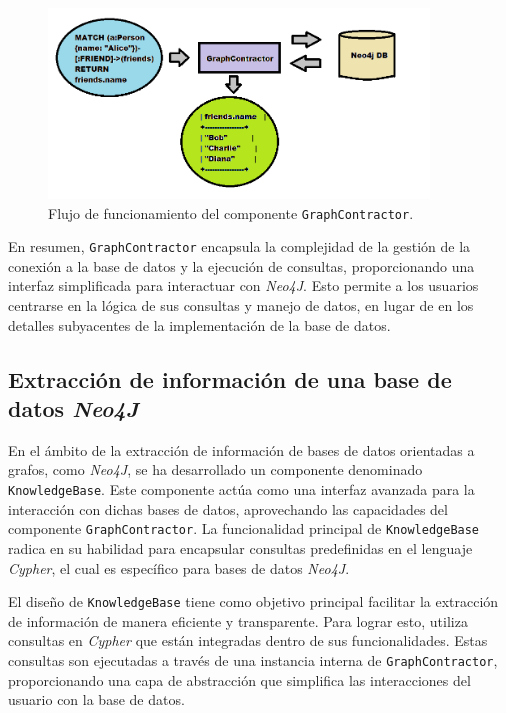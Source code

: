 \begin{figure}[H]\label{gcimage}
	\centering
	\includegraphics[width = 0.9\textwidth]{./Graphics/graph_contractor}
	\caption{Flujo de funcionamiento del componente \texttt{GraphContractor}.}
\end{figure}

En resumen, \texttt{GraphContractor} encapsula la complejidad de la gestión de la conexión a la base de datos y la ejecución de consultas, proporcionando una interfaz simplificada para interactuar con \textit{Neo4J}. Esto permite a los usuarios centrarse en la lógica de sus consultas y manejo de datos, en lugar de en los detalles subyacentes de la implementación de la base de datos.

\subsection{Extracción de información de una base de datos \textit{Neo4J}} \label{knowledge_base}

En el ámbito de la extracción de información de bases de datos orientadas a grafos, como \textit{Neo4J}, se ha desarrollado un componente denominado \texttt{KnowledgeBase}. Este componente actúa como una interfaz avanzada para la interacción con dichas bases de datos, aprovechando las capacidades del componente \texttt{GraphContractor}. La funcionalidad principal de \texttt{KnowledgeBase} radica en su habilidad para encapsular consultas predefinidas en el lenguaje \textit{Cypher}, el cual es específico para bases de datos \textit{Neo4J}.

El diseño de \texttt{KnowledgeBase} tiene como objetivo principal facilitar la extracción de información de manera eficiente y transparente. Para lograr esto, utiliza consultas en \textit{Cypher} que están integradas dentro de sus funcionalidades. Estas consultas son ejecutadas a través de una instancia interna de \texttt{GraphContractor}, proporcionando una capa de abstracción que simplifica las interacciones del usuario con la base de datos.

